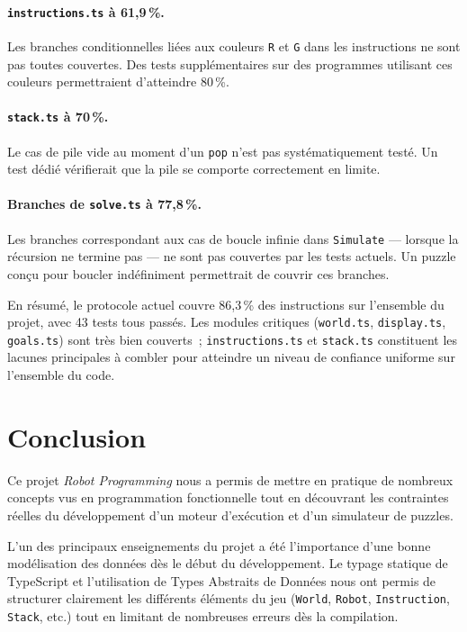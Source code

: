 \documentclass[12pt,a4paper]{article}
\begin{document}
\paragraph{\texttt{instructions.ts} à 61,9\,\%.}
Les branches conditionnelles liées aux couleurs \texttt{R} et \texttt{G}
dans les instructions ne sont pas toutes couvertes. Des tests
supplémentaires sur des programmes utilisant ces couleurs
permettraient d'atteindre 80\,\%.
 
\paragraph{\texttt{stack.ts} à 70\,\%.}
Le cas de pile vide au moment d'un \texttt{pop} n'est pas
systématiquement testé. Un test dédié vérifierait que la pile se
comporte correctement en limite.
 
\paragraph{Branches de \texttt{solve.ts} à 77,8\,\%.}
Les branches correspondant aux cas de boucle infinie dans
\texttt{Simulate} — lorsque la récursion ne termine pas — ne sont pas
couvertes par les tests actuels. Un puzzle conçu pour boucler
indéfiniment permettrait de couvrir ces branches.
 
\bigskip
\noindent En résumé, le protocole actuel couvre 86,3\,\% des instructions
sur l'ensemble du projet, avec 43 tests tous passés. Les modules
critiques (\texttt{world.ts}, \texttt{display.ts}, \texttt{goals.ts})
sont très bien couverts~; \texttt{instructions.ts} et \texttt{stack.ts}
constituent les lacunes principales à combler pour atteindre un niveau
de confiance uniforme sur l'ensemble du code.

\section{Conclusion}

Ce projet \textit{Robot Programming} nous a permis de mettre en pratique de nombreux concepts vus en programmation fonctionnelle tout en découvrant les contraintes réelles du développement d’un moteur d’exécution et d’un simulateur de puzzles.

L’un des principaux enseignements du projet a été l’importance d’une bonne modélisation des données dès le début du développement. Le typage statique de TypeScript et l’utilisation de Types Abstraits de Données nous ont permis de structurer clairement les différents éléments du jeu (\texttt{World}, \texttt{Robot}, \texttt{Instruction}, \texttt{Stack}, etc.) tout en limitant de nombreuses erreurs dès la compilation.
\end{document}
